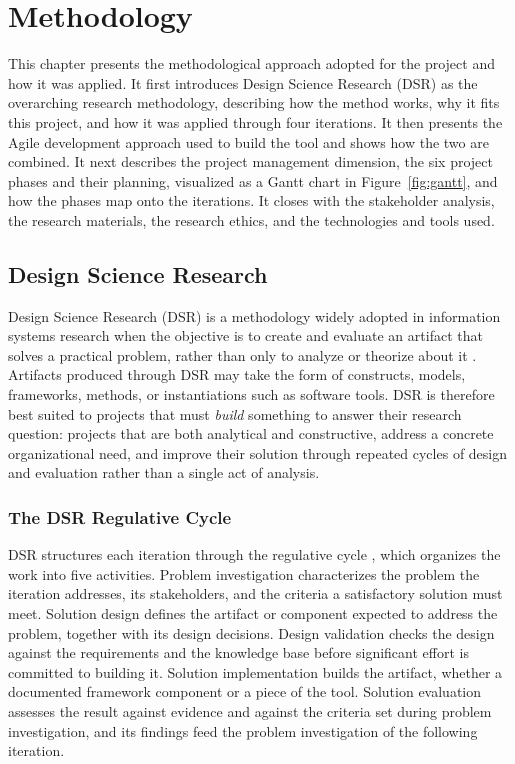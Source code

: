 
\section{Methodology}

This chapter presents the methodological approach adopted for the project and how it was applied. It first introduces Design Science Research (DSR) as the overarching research methodology, describing how the method works, why it fits this project, and how it was applied through four iterations. It then presents the Agile development approach used to build the tool and shows how the two are combined. It next describes the project management dimension, the six project phases and their planning, visualized as a Gantt chart in Figure~\ref{fig:gantt}, and how the phases map onto the iterations. It closes with the stakeholder analysis, the research materials, the research ethics, and the technologies and tools used.

\subsection{Design Science Research}

Design Science Research (DSR) is a methodology widely adopted in information systems research when the objective is to create and evaluate an artifact that solves a practical problem, rather than only to analyze or theorize about it \cite{hevner2004}. Artifacts produced through DSR may take the form of constructs, models, frameworks, methods, or instantiations such as software tools. DSR is therefore best suited to projects that must \emph{build} something to answer their research question: projects that are both analytical and constructive, address a concrete organizational need, and improve their solution through repeated cycles of design and evaluation rather than a single act of analysis.

\subsubsection{The DSR Regulative Cycle}

DSR structures each iteration through the regulative cycle \cite{wieringa2014}, which organizes the work into five activities. Problem investigation characterizes the problem the iteration addresses, its stakeholders, and the criteria a satisfactory solution must meet. Solution design defines the artifact or component expected to address the problem, together with its design decisions. Design validation checks the design against the requirements and the knowledge base before significant effort is committed to building it. Solution implementation builds the artifact, whether a documented framework component or a piece of the tool. Solution evaluation assesses the result against evidence and against the criteria set during problem investigation, and its findings feed the problem investigation of the following iteration.

